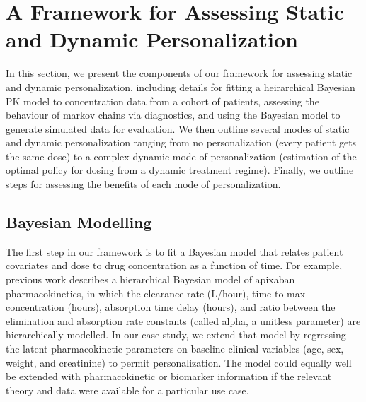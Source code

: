 \section{A Framework for Assessing Static and Dynamic Personalization}\label{ss:framework}

In this section, we present the components of our framework for assessing static and dynamic personalization, including details for fitting a heirarchical Bayesian PK model to concentration data from a cohort of patients, assessing the behaviour of markov chains via diagnostics, and using the Bayesian model to generate simulated data for evaluation. We then outline several modes of static and dynamic personalization ranging from no personalization (every patient gets the same dose) to a complex dynamic mode of personalization (estimation of the optimal policy for dosing from a dynamic treatment regime).  Finally, we outline steps for assessing the benefits of each mode of personalization.

\subsection{Bayesian Modelling}

The first step in our framework is to fit a Bayesian model that relates patient covariates and dose to drug concentration as a function of time. For example, previous work \cite{pananos2020comparisons} describes a hierarchical Bayesian model of apixaban pharmacokinetics, in which the clearance rate (L/hour), time to max concentration (hours), absorption time delay (hours), and ratio between the elimination and absorption rate constants (called alpha, a unitless parameter) are hierarchically modelled. In our case study, we extend that model by regressing the latent pharmacokinetic parameters on baseline clinical variables (age, sex, weight, and creatinine) to permit personalization. The model could equally well be extended with pharmacokinetic or biomarker information if the relevant theory and data were available for a particular use case.

